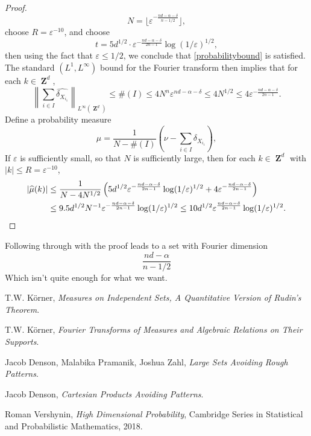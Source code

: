 \documentclass[12pt,reqno]{article}
\numberwithin{equation}{section}
\DeclareMathOperator{\ZZ}{\mathbf{Z}}
\begin{document}
\begin{proof}
    \[ N = \lfloor \varepsilon^{-\frac{nd - \alpha - \delta}{n - 1/2}} \rfloor, \]
    choose $R = \varepsilon^{-10}$, and choose
    \[ t = 5d^{1/2} \cdot \varepsilon^{- \frac{nd - \alpha - \delta}{2n - 1}} \log(1/\varepsilon)^{1/2}, \]
    then using the fact that $\varepsilon \leq 1/2$, we conclude that \eqref{probabilitybound} is satisfied. The standard $(L^1,L^\infty)$ bound for the Fourier transform then implies that for each $k \in \ZZ^d$,
    \[ \left\| \sum_{i \in I} \widehat{\delta_{X_{i_1}}} \right\|_{L^\infty(\ZZ^d)} \leq \#(I) \leq 4 N^n \varepsilon^{nd - \alpha - \delta} \leq 4 N^{1/2} \leq 4 \varepsilon^{- \frac{nd - \alpha - \delta}{2n - 1}}. \]
    Define a probability measure
    \[ \mu = \frac{1}{N - \#(I)} \left( \nu - \sum_{i \in I} \delta_{X_{i_1}} \right), \]
    If $\varepsilon$ is sufficiently small, so that $N$ is sufficiently large, then for each $k \in \ZZ^d$ with $|k| \leq R = \varepsilon^{-10}$,
    \begin{align*}
        |\widehat{\mu}(k)| &\leq \frac{1}{N - 4N^{1/2}} \left( 5d^{1/2} \varepsilon^{- \frac{nd - \alpha - \delta}{2n - 1}} \log(1/\varepsilon)^{1/2} +  4 \varepsilon^{- \frac{nd - \alpha - \delta}{2n - 1}} \right)\\
        &\leq 9.5 d^{1/2} N^{-1} \varepsilon^{- \frac{nd - \alpha - \delta}{2n - 1}} \log(1/\varepsilon)^{1/2} \leq 10 d^{1/2} \varepsilon^{\frac{nd - \alpha - \delta}{2n - 1}} \log(1/\varepsilon)^{1/2}. \qedhere
    \end{align*}
\end{proof}

Following through with the proof leads to a set with Fourier dimension
%
\[ \frac{nd - \alpha}{n - 1/2} \]
%
Which isn't quite enough for what we want.

\begin{thebibliography}{9}

    T.W. K\"{o}rner,
    \textit{Measures on Independent Sets, A Quantitative Version of Rudin's Theorem}.

    T.W. K\"{o}rner,
    \textit{Fourier Transforms of Measures and Algebraic Relations on Their Supports}.

    Jacob Denson, Malabika Pramanik, Joshua Zahl,
    \textit{Large Sets Avoiding Rough Patterns}.

    Jacob Denson,
    \textit{Cartesian Products Avoiding Patterns}.

    Roman Vershynin,
    \textit{High Dimensional Probability},
    Cambridge Series in Statistical and Probabilistic Mathematics,
    2018.

\end{thebibliography}
\end{document}

